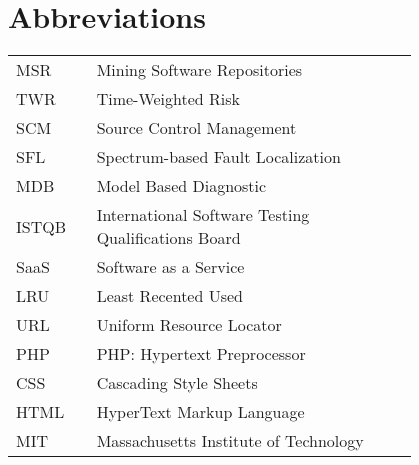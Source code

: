 \chapter*{Abbreviations}

\begin{flushleft}
\begin{tabular}{l p{0.8\linewidth}}
MSR & Mining Software Repositories\\
TWR & Time-Weighted Risk\\
SCM & Source Control Management \\
SFL & Spectrum-based Fault Localization \\
MDB & Model Based Diagnostic \\
ISTQB & International Software Testing Qualifications Board \\
SaaS & Software as a Service \\
LRU & Least Recented Used \\
URL & Uniform Resource Locator \\
PHP & PHP: Hypertext Preprocessor \\
CSS & Cascading Style Sheets \\
HTML & HyperText Markup Language \\
MIT & Massachusetts Institute of Technology
\end{tabular}
\end{flushleft}

